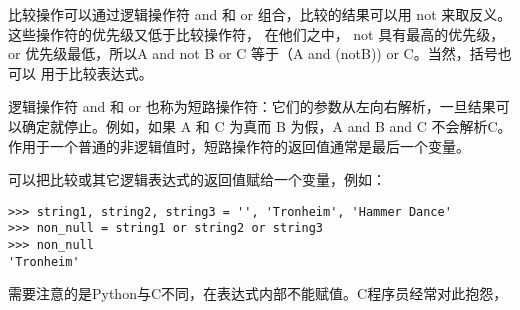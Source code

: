 \documentclass[UTF8]{ctexart}
\begin{document}
比较操作可以通过逻辑操作符 and 和 or 组合，比较的结果可以用 not 来取反义。这些操作符的优先级又低于比较操作符，
在他们之中， not 具有最高的优先级，or 优先级最低，所以A and not B or C 等于（A and (notB)) or C。当然，括号也可以
用于比较表达式。

逻辑操作符 and 和 or 也称为短路操作符：它们的参数从左向右解析，一旦结果可以确定就停止。例如，如果 A 和 C 为真而
B 为假，A and B and C 不会解析C。作用于一个普通的非逻辑值时，短路操作符的返回值通常是最后一个变量。

可以把比较或其它逻辑表达式的返回值赋给一个变量，例如：
\begin{verbatim}
>>> string1, string2, string3 = '', 'Tronheim', 'Hammer Dance'
>>> non_null = string1 or string2 or string3
>>> non_null
'Tronheim'
\end{verbatim}

需要注意的是Python与C不同，在表达式内部不能赋值。C程序员经常对此抱怨，
\end{document}
